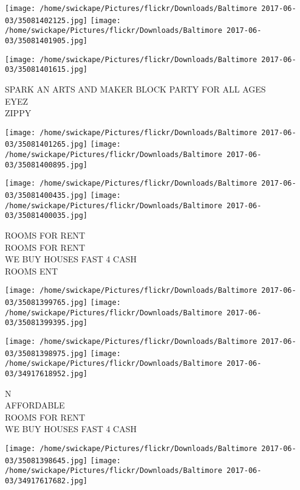 \documentclass[10pt,letterpaper]{article}
\begin{document}
\texttt{[image: /home/swickape/Pictures/flickr/Downloads/Baltimore 2017-06-03/35081402125.jpg]}
\texttt{[image: /home/swickape/Pictures/flickr/Downloads/Baltimore 2017-06-03/35081401905.jpg]}

\vspace{0.25in}
\texttt{[image: /home/swickape/Pictures/flickr/Downloads/Baltimore 2017-06-03/35081401615.jpg]}

SPARK AN ARTS AND MAKER BLOCK PARTY FOR ALL AGES\\
EYEZ\\
ZIPPY\\
\pagebreak

\texttt{[image: /home/swickape/Pictures/flickr/Downloads/Baltimore 2017-06-03/35081401265.jpg]}
\texttt{[image: /home/swickape/Pictures/flickr/Downloads/Baltimore 2017-06-03/35081400895.jpg]}

\texttt{[image: /home/swickape/Pictures/flickr/Downloads/Baltimore 2017-06-03/35081400435.jpg]}
\texttt{[image: /home/swickape/Pictures/flickr/Downloads/Baltimore 2017-06-03/35081400035.jpg]}

ROOMS FOR RENT\\
ROOMS FOR RENT\\
WE BUY HOUSES FAST 4 CASH\\
ROOMS ENT\\
\pagebreak

\texttt{[image: /home/swickape/Pictures/flickr/Downloads/Baltimore 2017-06-03/35081399765.jpg]}
\texttt{[image: /home/swickape/Pictures/flickr/Downloads/Baltimore 2017-06-03/35081399395.jpg]}

\texttt{[image: /home/swickape/Pictures/flickr/Downloads/Baltimore 2017-06-03/35081398975.jpg]}
\texttt{[image: /home/swickape/Pictures/flickr/Downloads/Baltimore 2017-06-03/34917618952.jpg]}

N\\
AFFORDABLE\\
ROOMS FOR RENT\\
WE BUY HOUSES FAST 4 CASH\\
\pagebreak

\texttt{[image: /home/swickape/Pictures/flickr/Downloads/Baltimore 2017-06-03/35081398645.jpg]}
\texttt{[image: /home/swickape/Pictures/flickr/Downloads/Baltimore 2017-06-03/34917617682.jpg]}
\end{document}
